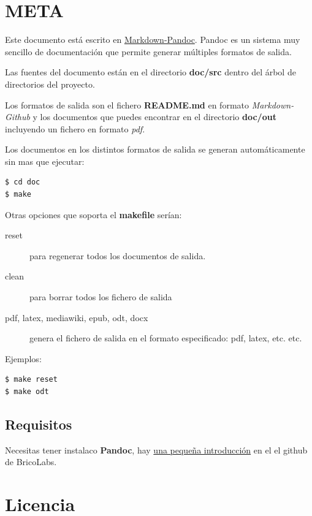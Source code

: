 \documentclass[12pt,spanish,]{scrartcl}
\begin{document}
\section{META}\label{meta}

Este documento está escrito en
\href{http://pandoc.org/README.html}{Markdown-Pandoc}. Pandoc es un
sistema muy sencillo de documentación que permite generar múltiples
formatos de salida.

Las fuentes del documento están en el directorio \textbf{doc/src} dentro
del árbol de directorios del proyecto.

Los formatos de salida son el fichero \textbf{README.md} en formato
\emph{Markdown-Github} y los documentos que puedes encontrar en el
directorio \textbf{doc/out} incluyendo un fichero en formato \emph{pdf}.

Los documentos en los distintos formatos de salida se generan
automáticamente sin mas que ejecutar:

\begin{verbatim}
$ cd doc
$ make
\end{verbatim}

Otras opciones que soporta el \textbf{makefile} serían:

\begin{description}
\item[reset]
para regenerar todos los documentos de salida.
\item[clean]
para borrar todos los fichero de salida
\item[pdf, latex, mediawiki, epub, odt, docx]
genera el fichero de salida en el formato especificado: pdf, latex, etc.
etc.
\end{description}

Ejemplos:

\begin{verbatim}
$ make reset
$ make odt
\end{verbatim}

\subsection{Requisitos}\label{requisitos}

Necesitas tener instalaco \textbf{Pandoc}, hay
\href{https://github.com/brico-labs/pandoc_basico}{una pequeña
introducción} en el el github de BricoLabs.

\section{Licencia}\label{licencia}
\end{document}
